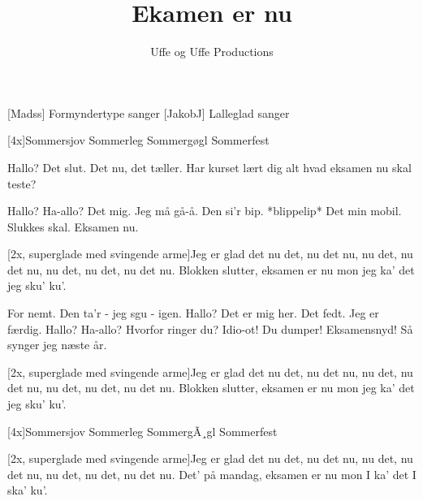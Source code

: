 \documentclass[a4paper,11pt]{article}
\title{Ekamen er nu}
\author{Uffe og Uffe Productions}
\begin{document}
\maketitle

\begin{roles}
[Madss] Formyndertype sanger
[JakobJ] Lalleglad sanger
\end{roles}

\begin{props}
\prop{}
\end{props}

  
\begin{song}

[4x]Sommersjov
Sommerleg
Sommergøgl
Sommerfest


 Hallo? Det slut. Det nu, det tæller.
Har kurset lært dig alt hvad
eksamen nu skal teste?

 Hallo? Ha-allo?
Det mig. Jeg må gå-å.
Den si'r bip. *blippelip* Det min mobil.
Slukkes skal. Eksamen nu.


[2x, superglade med svingende arme]Jeg er glad
det nu det, nu det nu,
nu det, nu det nu,
nu det, nu det, nu det nu.
Blokken slutter, eksamen er nu
mon jeg ka' det jeg sku' ku'.


 For nemt. Den ta'r - jeg sgu - igen.
Hallo? Det er mig her. Det fedt. Jeg er færdig.
 Hallo? Ha-allo? Hvorfor ringer du? Idio-ot!
Du dumper! Eksamensnyd!
 Så synger jeg næste år.


[2x, superglade med svingende arme]Jeg er glad
det nu det, nu det nu,
nu det, nu det nu,
nu det, nu det, nu det nu.
Blokken slutter, eksamen er nu
mon jeg ka' det jeg sku' ku'.

[4x]Sommersjov
Sommerleg
SommergÃ¸gl
Sommerfest


[2x, superglade med svingende arme]Jeg er glad
det nu det, nu det nu,
nu det, nu det nu,
nu det, nu det, nu det nu.
Det' på mandag, eksamen er nu
mon I ka' det I ska' ku'.



\end{song}
\end{document}
